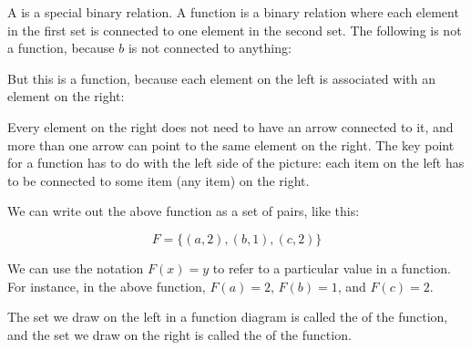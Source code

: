 \documentclass[../../../main.tex]{subfiles}
\begin{document}
A  is a special binary relation. A function is a binary relation where each element in the first set is connected to one element in the second set. The following is not a function, because $b$ is not connected to anything:

\begin{center}\end{center}

\noindent
But this is a function, because each element on the left is associated with an element on the right:

\begin{center}\end{center}

\noindent
Every element on the right does not need to have an arrow connected to it, and more than one arrow can point to the same element on the right. The key point for a function has to do with the left side of the picture: each item on the left has to be connected to some item (any item) on the right.

We can write out the above function as a set of pairs, like this:

\begin{equation*}
F = \{ (a, 2), (b, 1), (c, 2) \}
\end{equation*}

\noindent
We can use the notation $F(x) = y$ to refer to a particular value in a function. For instance, in the above function, $F(a) = 2$, $F(b) = 1$, and $F(c) = 2$.

The set we draw on the left in a function diagram is called the  of the function, and the set we draw on the right is called the  of the function.
\end{document}
